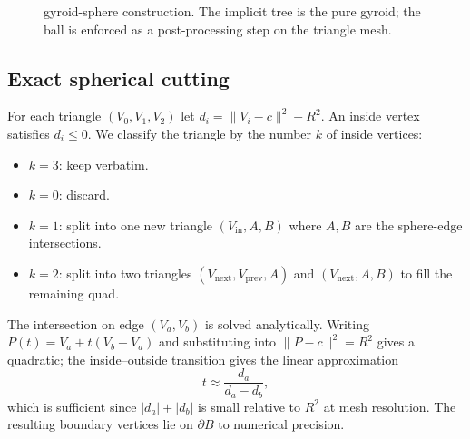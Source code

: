 \documentclass[11pt]{article}
\begin{document}
\begin{figure}[h]
  \centering
  \caption{\label{fig:pipeline} gyroid-sphere construction.  The implicit
    tree is the pure gyroid; the ball is enforced as a post-processing
    step on the triangle mesh.}
\end{figure}

\subsection{Exact spherical cutting}

For each triangle $(V_0,V_1,V_2)$ let $d_i = \|V_i-c\|^2 - R^2$.  An
inside vertex satisfies $d_i\le 0$.  We classify the triangle by the
number $k$ of inside vertices:

\begin{itemize}
  \item $k=3$: keep verbatim.
  \item $k=0$: discard.
  \item $k=1$: split into one new triangle $(V_\text{in},A,B)$ where
        $A,B$ are the sphere-edge intersections.
  \item $k=2$: split into two triangles
        $(V_\text{next},V_\text{prev},A)$ and
        $(V_\text{next},A,B)$ to fill the remaining quad.
\end{itemize}

The intersection on edge $(V_a,V_b)$ is solved analytically.  Writing
$P(t) = V_a + t(V_b-V_a)$ and substituting into
$\|P-c\|^2 = R^2$ gives a quadratic; the inside--outside transition
gives the linear approximation
\[
  t \approx \frac{d_a}{d_a - d_b},
\]
which is sufficient since $|d_a|+|d_b|$ is small relative to $R^2$ at
mesh resolution.  The resulting boundary vertices lie on $\partial B$
to numerical precision.
\end{document}
